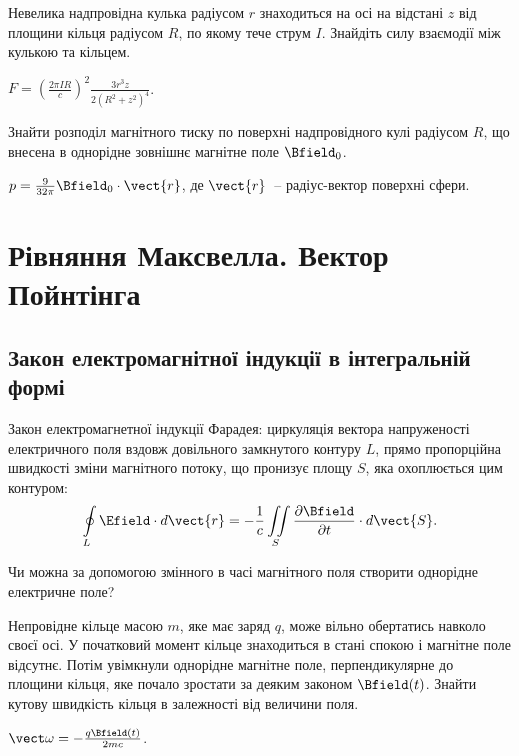 \begin{problem}
Невелика надпровідна кулька радіусом $r$ знаходиться на осі на відстані $z$ від площини кільця радіусом $R$, по якому тече струм $I$. Знайдіть силу взаємодії між кулькою та кільцем.
\begin{solution}
	$F = \left( \frac{2\pi I R}{c} \right)^2 \frac{3r^3 z}{2(R^2 + z^2)^4} $.
\end{solution}
\end{problem}


\begin{problem}
Знайти розподіл магнітного тиску по поверхні надпровідного кулі радіусом $R$, що внесена в однорідне зовнішнє магнітне поле $\Bfield_0$.
\begin{solution}
	$ p = \frac{9}{32\pi} \Bfield_0\cdot\vect{r}$, де $\vect{r}$~-- радіус-вектор поверхні сфери.
\end{solution}
\end{problem}


\section{Рівняння Максвелла. Вектор Пойнтінга}

\subsection*{Закон електромагнітної індукції в інтегральній формі}
\begin{Theory}
	Закон електромагнетної індукції Фарадея: циркуляція вектора напруженості електричного поля вздовж довільного замкнутого контуру $L$, прямо пропорційна швидкості зміни магнітного потоку, що пронизує площу $S$, яка охоплюється цим контуром:
	\begin{equation}
		\oint\limits_L \Efield \cdot d\vect{r} = - \frac1c\iint\limits_S \frac{\partial \Bfield}{\partial t}\cdot d\vect{S}.
	\end{equation}
\end{Theory}

\begin{problem}
    Чи можна за допомогою змінного в часі магнітного поля створити однорідне електричне поле?
\end{problem}

\begin{problem}\label{prb:aka_Faynmann_disk_paradox}
Непровідне кільце масою $m$, яке має заряд $q$, може вільно обертатись навколо своєї осі. У початковий момент кільце знаходиться в стані спокою і магнітне поле відсутнє. Потім увімкнули однорідне магнітне поле, перпендикулярне до площини кільця, яке почало зростати за деяким законом $\Bfield(t)$. Знайти кутову швидкість кільця в залежності від величини поля.
\begin{solution}
	$\vect\omega = -\frac{q\Bfield(t)}{2mc}$.
\end{solution}
\end{problem}


